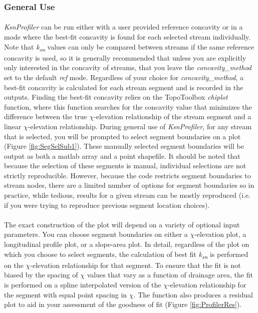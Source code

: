 \subsubsection{General Use}
\paragraph{}\textit{KsnProfiler} can be run either with a user provided reference concavity or in a mode where the best-fit concavity is found for each selected stream individually. Note that \textit{k\textsubscript{sn}} values can only be compared between streams if the same reference concavity is used, so it is generally recommended that unless you are explicitly only interested in the concavity of streams, that you leave the \textit{concavity\_method} set to the default \textit{ref} mode. Regardless of your choice for \textit{concavity\_method}, a best-fit concavity is calculated for each stream segment and is recorded in the outputs. Finding the best-fit concavity relies on the TopoToolbox \textit{chiplot} function, where this function searches for the concavity value that minimizes the difference between the true $\chi$-elevation relationship of the stream segment and a linear $\chi$-elevation relationship. During general use of \textit{KsnProfiler}, for any stream that is selected, you will be prompted to select segment boundaries on a plot (Figure \ref{fig:SegSelSub1}). These manually selected segment boundaries will be output as both a matlab array and a point shapefile. It should be noted that because the selection of these segments is manual, individual selections are not strictly reproducible. However, because the code restricts segment boundaries to stream nodes, there are a limited number of options for segment boundaries so in practice, while tedious, results for a given stream can be mostly reproduced (i.e. if you were trying to reproduce previous segment location choices).

\paragraph{}The exact construction of the plot will depend on a variety of optional input parameters. You can choose segment boundaries on either a $\chi$-elevation plot, a longitudinal profile plot, or a slope-area plot. In detail, regardless of the plot on which you choose to select segments, the calculation of best fit \textit{k\textsubscript{sn}} is performed on the $\chi$-elevation relationship for that segment. To ensure that the fit is not biased by the spacing of $\chi$ values that vary as a function of drainage area, the fit is performed on a spline interpolated version of the $\chi$-elevation relationship for the segment with equal point spacing in $\chi$. The function also produces a residual plot to aid in your assessment of the goodness of fit (Figure \ref{fig:ProfilerRes}).

